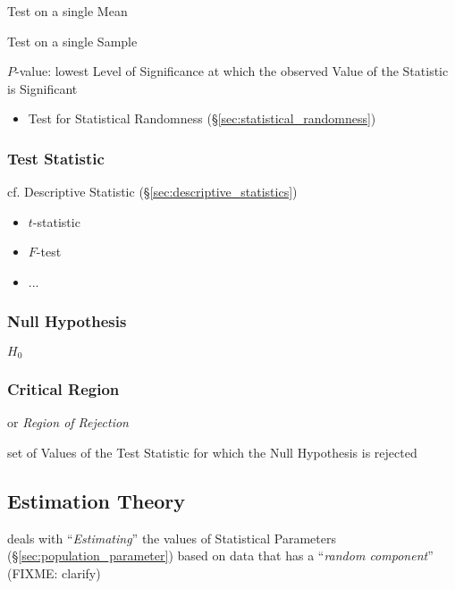 Test on a single Mean

Test on a single Sample

$P$-value: lowest Level of Significance at which the observed Value of
the Statistic is Significant

\begin{itemize}
  \item Test for Statistical Randomness (\S\ref{sec:statistical_randomness})
\end{itemize}



\subsubsection{Test Statistic}\label{sec:test_statistic}

cf. Descriptive Statistic (\S\ref{sec:descriptive_statistics})

\begin{itemize}
  \item $t$-statistic
  \item $F$-test
  \item ...
\end{itemize}



\subsubsection{Null Hypothesis}\label{sec:null_hypothesis}

$H_0$



\subsubsection{Critical Region}\label{sec:critical_region}

or \emph{Region of Rejection}

set of Values of the Test Statistic for which the Null Hypothesis is rejected



\subsection{Estimation Theory}\label{sec:estimation_theory}

deals with ``\emph{Estimating}'' the values of Statistical Parameters
(\S\ref{sec:population_parameter}) based on data that has a ``\emph{random
  component}'' (FIXME: clarify)

